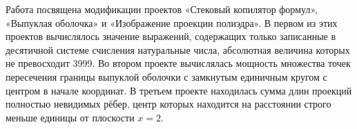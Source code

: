Работа посвящена модификации проектов «Стековый копилятор формул», 
«Выпуклая оболочка» и «Изображение проекции полиэдра». В первом из этих 
проектов вычислялось значение выражений, содержащих только записанные 
в десятичной системе счисления натуральные числа, абсолютная величина которых 
не превосходит 3999. Во втором проекте вычислялась мощность множества 
точек пересечения границы выпуклой оболочки с замкнутым единичным 
кругом с центром в начале координат. В третьем проекте находилась сумма 
длин проекций полностью невидимых рёбер, центр которых находится 
на расстоянии строго меньше единицы от плоскости $x=2$.
